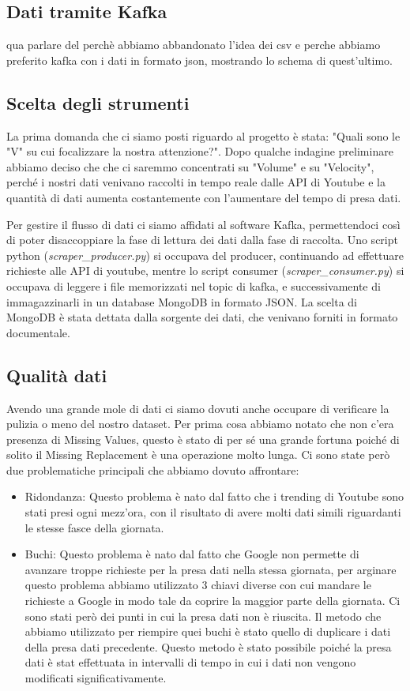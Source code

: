 \documentclass[10pt, a4paper,openany]{article}
\begin{document}
\subsection{Dati tramite Kafka}
qua parlare del perchè abbiamo abbandonato l'idea dei csv e perche abbiamo preferito kafka con i dati in formato json, mostrando lo schema di quest'ultimo.

\subsection*{Scelta degli strumenti}
La prima domanda che ci siamo posti riguardo al progetto è stata: "Quali sono le "V" su cui focalizzare la nostra attenzione?".
Dopo qualche indagine preliminare abbiamo deciso che che ci saremmo concentrati su "Volume" e su "Velocity", perché i nostri dati venivano raccolti in tempo reale dalle API di Youtube e la quantità di dati aumenta costantemente con l'aumentare del tempo di presa dati.

Per gestire il flusso di dati ci siamo affidati al software Kafka, permettendoci così di poter disaccoppiare la fase di lettura dei dati dalla fase di  raccolta. Uno script python (\textit{scraper\_producer.py}) si occupava del producer, continuando ad effettuare richieste alle API di youtube, mentre lo script consumer (\textit{scraper\_consumer.py}) si occupava di leggere i file memorizzati nel topic di kafka, e successivamente di immagazzinarli in un database MongoDB in formato JSON. La scelta di MongoDB è stata dettata dalla sorgente dei dati, che venivano forniti in formato documentale.
 
\subsection*{Qualità dati}

Avendo una grande mole di dati ci siamo dovuti anche occupare di verificare la pulizia o meno del nostro dataset. Per prima cosa abbiamo notato che non c'era presenza di Missing Values, questo è stato di per sé una grande fortuna poiché di solito il Missing Replacement è una operazione molto lunga.  Ci sono state però due problematiche principali che abbiamo dovuto affrontare:
\begin{itemize}
	\item Ridondanza: Questo problema è nato dal fatto che i trending di Youtube sono stati presi ogni mezz'ora, con il risultato di avere molti dati simili riguardanti le stesse fasce della giornata. 
	\item Buchi: Questo problema è nato dal fatto che Google non permette di avanzare troppe richieste per la presa dati nella stessa giornata, per arginare questo problema abbiamo utilizzato 3 chiavi diverse con cui mandare le richieste a Google in modo tale da coprire la maggior parte della giornata. Ci sono stati però dei punti in cui la presa dati non è riuscita. Il metodo che abbiamo utilizzato per riempire quei buchi è stato quello di duplicare i dati della presa dati precedente. Questo metodo è stato possibile poiché la presa dati è stat effettuata in intervalli di tempo in cui i dati non vengono modificati significativamente.
	
\end{itemize}
\end{document}
